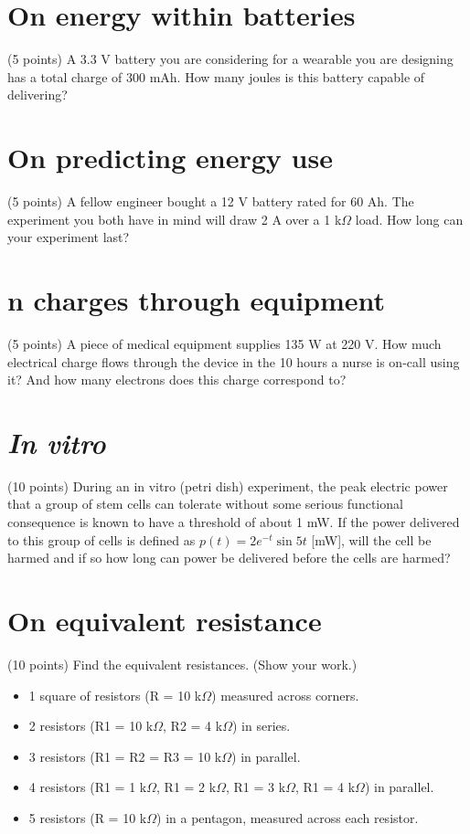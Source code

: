 \documentclass[11pt]{book}
\begin{document}
\newpage

\section{On energy within batteries}
(5 points) A  3.3 V battery you are considering for a wearable you are designing has a total charge of 300 mAh. How many joules is this battery capable of delivering?

\section{On predicting energy use}
(5 points) A fellow engineer bought a 12 V battery rated for 60 Ah. The experiment you both have in mind will draw 2 A over a 1 k$\Omega$ load. How long can your experiment last?

\section{n charges through equipment}
(5 points) A piece of medical equipment supplies 135 W at 220 V. How much electrical charge flows through the device in the 10 hours a nurse is on-call using it? And how many electrons does this charge correspond to?

\section{\textit{In vitro}}
(10 points) During an in vitro (petri dish) experiment, the peak electric power that a group of stem cells can tolerate without some serious functional consequence is known to have a threshold of about 1 mW. If the power delivered to this group of cells is defined as $p(t) = 2e^{-t}\sin 5t$ [mW], will the cell be harmed and if so how long can power be delivered before the cells are harmed?

\section{On equivalent resistance}
(10 points) Find the equivalent resistances. (Show your work.)
\begin{itemize}
	\item 1 square of resistors (R = 10 k$\Omega$) measured across corners.
	\item 2 resistors (R1 = 10 k$\Omega$, R2 = 4 k$\Omega$) in series.
	\item 3 resistors (R1 = R2 = R3 = 10 k$\Omega$) in parallel.
	\item 4 resistors (R1 = 1 k$\Omega$, R1 = 2 k$\Omega$, R1 = 3 k$\Omega$, R1 = 4 k$\Omega$) in parallel.
	\item 5 resistors (R = 10 k$\Omega$) in a pentagon, measured across each resistor.
\end{itemize}
\end{document}
